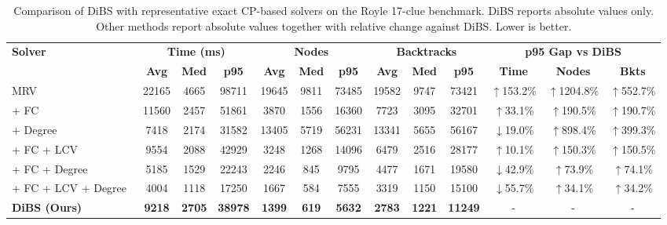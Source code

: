\documentclass[lettersize,journal]{IEEEtran}
\newcommand{\good}[1]{{\color{green!50!black}$\downarrow$#1}}
\newcommand{\bad}[1]{{\color{red!70!black}$\uparrow$#1}}
\begin{document}
\begin{table}[t]
\centering
\caption{Comparison of DiBS with representative exact CP-based solvers on the Royle 17-clue\cite{royle2005minimum} benchmark. DiBS reports absolute values only. Other methods report absolute values together with relative change against DiBS. Lower is better.}
\label{tab:main_royle17}
\small
\setlength{\tabcolsep}{4.1pt}
\renewcommand{\arraystretch}{1.10}
\begin{tabular}{lcccccccccccc}
\toprule
\textbf{Solver} &
\multicolumn{3}{c}{\textbf{Time (ms)}} &
\multicolumn{3}{c}{\textbf{Nodes}} &
\multicolumn{3}{c}{\textbf{Backtracks}} &
\multicolumn{3}{c}{\textbf{p95 Gap vs DiBS}} \\
\cmidrule(lr){2-4}\cmidrule(lr){5-7}\cmidrule(lr){8-10}\cmidrule(lr){11-13}
& \textbf{Avg} & \textbf{Med} & \textbf{p95}
& \textbf{Avg} & \textbf{Med} & \textbf{p95}
& \textbf{Avg} & \textbf{Med} & \textbf{p95}
& \textbf{Time} & \textbf{Nodes} & \textbf{Bkts} \\
\midrule
MRV~\cite{freuder1982sufficient}
& 22165 & 4665 & 98711
& 19645 & 9811 & 73485
& 19582 & 9747 & 73421
& \bad{153.2\%} & \bad{1204.8\%} & \bad{552.7\%} \\

+ FC~\cite{haralick1980increasing}
& 11560 & 2457 & 51861
& 3870 & 1556 & 16360
& 7723 & 3095 & 32701
& \bad{33.1\%} & \bad{190.5\%} & \bad{190.7\%} \\

+ Degree~\cite{dechter1987network}
& 7418 & 2174 & 31582
& 13405 & 5719 & 56231
& 13341 & 5655 & 56167
& \good{19.0\%} & \bad{898.4\%} & \bad{399.3\%} \\

+ FC + LCV\cite{haralick1980increasing}
& 9554 & 2088 & 42929
& 3248 & 1268 & 14096
& 6479 & 2516 & 28177
& \bad{10.1\%} & \bad{150.3\%} & \bad{150.5\%} \\

+ FC + Degree~\cite{haralick1980increasing,dechter1987network}
& 5185 & 1529 & 22243
& 2246 & 845 & 9795
& 4477 & 1671 & 19580
& \good{42.9\%} & \bad{73.9\%} & \bad{74.1\%} \\

+ FC + LCV + Degree~\cite{haralick1980increasing,dechter1987network}
& 4004 & 1118 & 17250
& 1667 & 584 & 7555
& 3319 & 1150 & 15100
& \good{55.7\%} & \bad{34.1\%} & \bad{34.2\%} \\

\midrule

\textbf{DiBS (Ours)}
& \textbf{9218} & \textbf{2705} & \textbf{38978}
& \textbf{1399} & \textbf{619} & \textbf{5632}
& \textbf{2783} & \textbf{1221} & \textbf{11249}
& - & - & -\\

\bottomrule
\end{tabular}
\end{table}
\end{document}
